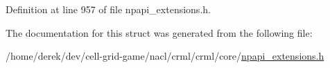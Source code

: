 Definition at line 957 of file npapi\_\-extensions.h.



The documentation for this struct was generated from the following file:\begin{DoxyCompactItemize}
\item 
/home/derek/dev/cell-\/grid-\/game/nacl/crml/crml/core/\hyperlink{npapi__extensions_8h}{npapi\_\-extensions.h}\end{DoxyCompactItemize}
